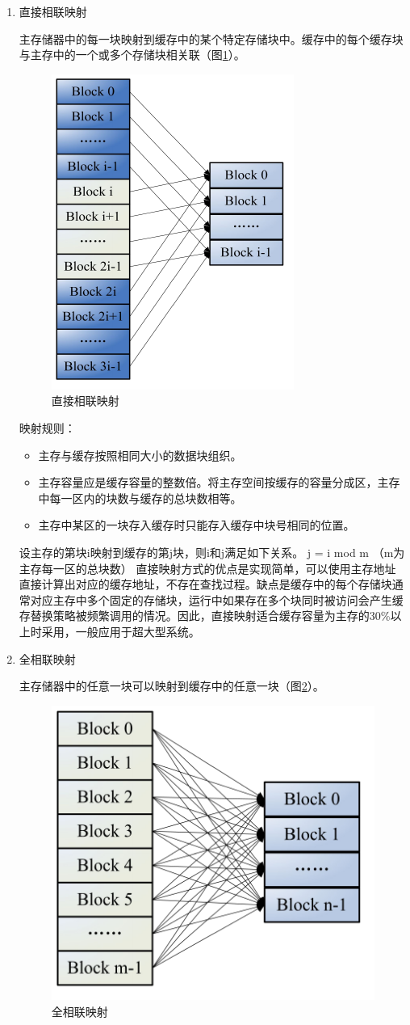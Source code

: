 \begin{enumerate}

\item 直接相联映射

主存储器中的每一块映射到缓存中的某个特定存储块中。缓存中的每个缓存块与主存中的一个或多个存储块相关联（图\ref{fig:cache-map-1}）。

\begin{figure}[H]
\centering
\includegraphics[width=0.3\linewidth]{./graph/cache-map-1}
\caption{直接相联映射}
\label{fig:cache-map-1}
\end{figure}

映射规则：
\begin{itemize}
\item 主存与缓存按照相同大小的数据块组织。
\item 主存容量应是缓存容量的整数倍。将主存空间按缓存的容量分成区，主存中每一区内的块数与缓存的总块数相等。 
\item 主存中某区的一块存入缓存时只能存入缓存中块号相同的位置。
\end{itemize}

设主存的第块i映射到缓存的第j块，则i和j满足如下关系。
j = i mod m	（m为主存每一区的总块数）
直接映射方式的优点是实现简单，可以使用主存地址直接计算出对应的缓存地址，不存在查找过程。缺点是缓存中的每个存储块通常对应主存中多个固定的存储块，运行中如果存在多个块同时被访问会产生缓存替换策略被频繁调用的情况。因此，直接映射适合缓存容量为主存的30\%以上时采用，一般应用于超大型系统。

\item 全相联映射

主存储器中的任意一块可以映射到缓存中的任意一块（图\ref{fig:cache-map-2}）。

\begin{figure}[H]
\centering
\includegraphics[width=0.3\linewidth]{./graph/cache-map-2}
\caption{全相联映射}
\label{fig:cache-map-2}
\end{figure}


\end{enumerate}

